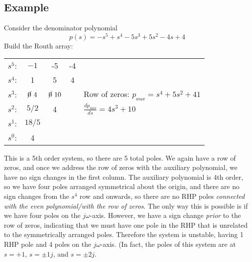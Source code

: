 \documentclass{book}
\begin{document}
\subsection*{Example}
Consider the denominator polynomial
\[ p(s)=-s^5+s^4-5s^3+5s^2-4s+4 \]
Build the Routh array:
\begin{center}
	\begin{tabular}{c c c c l}\vspace{1em}
		$ s^5 $: &  $ -1 $ & -5 & -4 & \\ \vspace{1em}
		$ s^4 $: &  1 & 5 & 4 & \\ \vspace{1em}
		$ s^3 $: & $ \cancel{0}\ 4 $ & $ \cancel{0}\ 10 $ & &  Row of zeros: $ p_{aux}=s^4+5s^2+41 $ \\ \vspace{1em}
		$ s^2 $: & $ 5/2 $ & 4 & & \hspace{4em} $ \frac{dp_{aux}}{ds} = 4s^3+10 $ \\
		$ s^1 $: & $ 18/5 $ & & & \\
		$ s^0 $: & 4 & & & \\
	\end{tabular}
\end{center}
This is a 5th order system, so there are 5 total poles. We again have a row of zeros, and once we address the row of zeros with the auxiliary polynomial, we have no sign changes in the first column. The auxiliary polynomial is 4th order, so we have four poles arranged symmetrical about the origin, and there are no sign changes from the $ s^4 $ row and onwards, so there are no RHP poles \textit{connected with the even polynomial/with the row of zeros}. The only way this is possible is if we have four poles on the $ j\omega $-axis. However, we have a sign change \textit{prior} to the row of zeros, indicating that we must have one pole in the RHP that is unrelated to the symmetrically arranged poles. Therefore the system is unstable, having 1 RHP pole and 4 poles on the $ j\omega $-axis. (In fact, the poles of this system are at $ s=+1 $, $ s=\pm1j $, and $ s=\pm2j $.
\end{document}

